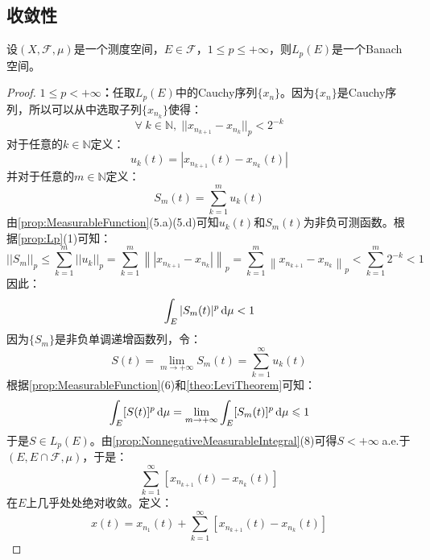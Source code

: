 \subsection{收敛性}
\begin{theorem}\label{theo:LpBanach}
	设$(X,\mathscr{F},\mu)$是一个测度空间，$E\in\mathscr{F}$，$1\leqslant p\leqslant+\infty$，则$L_p(E)$是一个Banach空间。
\end{theorem}
\begin{proof}
	\textbf{$1\leqslant p<+\infty$：}任取$L_p(E)$中的Cauchy序列$\{x_n\}$。因为$\{x_n\}$是Cauchy序列，所以可以从中选取子列$\{x_{n_k}\}$使得：
	\begin{equation*}
		\forall\;k\in\mathbb{N},\;||x_{n_{k+1}}-x_{n_k}||_p<2^{-k}
	\end{equation*}
	对于任意的$k\in\mathbb{N}$定义：
	\begin{equation*}
		u_k(t)=|x_{n_{k+1}}(t)-x_{n_k}(t)|
	\end{equation*}
	并对于任意的$m\in\mathbb{N}$定义：
	\begin{equation*}
		S_m(t)=\sum_{k=1}^{m}u_k(t)
	\end{equation*}
	由\cref{prop:MeasurableFunction}(5.a)(5.d)可知$u_k(t)$和$S_m(t)$为非负可测函数。根据\cref{prop:Lp}(1)可知：
	\begin{equation*}
		||S_m||_p\leqslant\sum_{k=1}^{m}||u_k||_p=\sum_{k=1}^{m}\left\||x_{n_{k+1}}-x_{n_k}|\right\|_p=\sum_{k=1}^{m}\left\|x_{n_{k+1}}-x_{n_k}\right\|_p<\sum_{k=1}^{m}2^{-k}<1
	\end{equation*}
	因此：
	\begin{equation*}
		\int_{E}|S_m(t)|^p\mathop{}\!\mathrm{d}\mu<1
	\end{equation*}
	因为$\{S_m\}$是非负单调递增函数列，令：
	\begin{equation*}
		S(t)=\lim_{m\to+\infty}S_m(t)=\sum_{k=1}^{\infty}u_k(t)
	\end{equation*}
	根据\cref{prop:MeasurableFunction}(6)和\cref{theo:LeviTheorem}可知：
	\begin{equation*}
		\int_{E}[S(t)]^p\mathop{}\!\mathrm{d}\mu=\lim_{m\to+\infty}\int_{E}[S_m(t)]^p\mathop{}\!\mathrm{d}\mu\leqslant1
	\end{equation*}
	于是$S\in L_p(E)$。由\cref{prop:NonnegativeMeasurableIntegral}(8)可得$S<+\infty\;$a.e.于$(E,E\cap\mathscr{F},\mu)$，于是：
	\begin{equation*}
		\sum_{k=1}^{\infty}\left[x_{n_{k+1}}(t)-x_{n_k}(t)\right]
	\end{equation*}
	在$E$上几乎处处绝对收敛。定义：
	\begin{equation*}
		x(t)=x_{n_1}(t)+\sum_{k=1}^{\infty}\left[x_{n_{k+1}}(t)-x_{n_k}(t)\right]

\end{equation*}
\end{proof}
